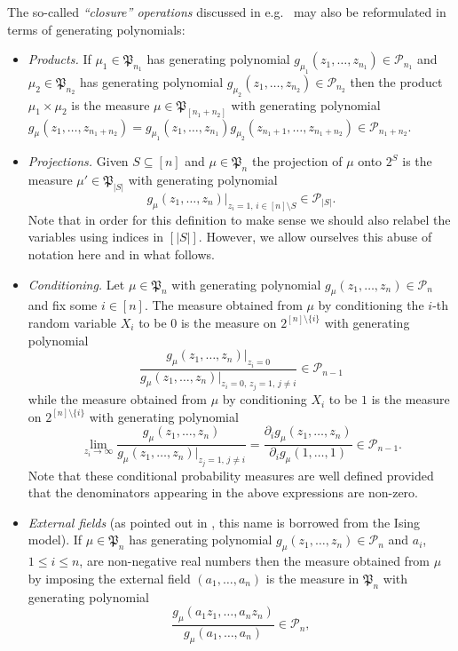 \documentclass[10pt,reqno]{amsart}
\theoremstyle{plain}
\theoremstyle{definition}
\theoremstyle{remark}
\newcommand{\PP}{\mathcal{P}}
\newcommand{\fP}{\mathfrak{P}}
\newcommand{\pa}{\partial}
\begin{document}
The so-called {\em ``closure'' operations}
discussed in e.g.~\cite[II.A]{P} may also be reformulated in terms of 
generating polynomials:

\begin{itemize}
\item[(i)] 
{\em Products.} If $\mu_1\in\fP_{n_1}$ has generating
polynomial $g_{\mu_1}(z_1,\ldots,z_{n_1})\in\PP_{n_1}$ and 
$\mu_2\in\fP_{n_2}$ has generating
polynomial $g_{\mu_2}(z_1,\ldots,z_{n_2})\in\PP_{n_2}$ then the product
$\mu_1\times \mu_2$ is the measure $\mu\in\fP_{[n_1+n_2]}$ with generating
polynomial
$g_\mu(z_1,\ldots,z_{n_1+n_2})
=g_{\mu_1}(z_1,\ldots,z_{n_1})g_{\mu_2}(z_{n_1+1},\ldots,z_{n_1+n_2})
\in\PP_{n_1+n_2}$.
\item[(ii)]
{\em Projections.} Given $S\subseteq [n]$ and $\mu\in\fP_n$ the 
projection of
$\mu$ onto $2^S$ is the measure $\mu'\in\fP_{|S|}$ with generating polynomial
$$g_\mu(z_1,\ldots,z_n)\big|_{z_i=1,\,i\in [n]\setminus S}\in\PP_{|S|}.$$
Note that in order for this definition 
to make sense we should also relabel the variables using indices in $[|S|]$. 
However, we allow ourselves this abuse of notation here and in what follows. 
\item[(iii)]
{\em Conditioning.} Let $\mu\in\fP_n$ with generating polynomial
$g_\mu(z_1,\ldots,z_n)\in\PP_n$ and fix some $i\in [n]$. The measure 
obtained from $\mu$ by conditioning the $i$-th random variable $X_i$ 
to be $0$ is the measure on $2^{[n]\setminus\{i\}}$ with generating polynomial
$$\frac{g_\mu(z_1,\ldots,z_n)\big|_{z_i=0}}
{g_\mu(z_1,\ldots,z_n)\big|_{z_i=0,\,z_j=1,\,j\neq i}}\in\PP_{n-1}$$
while the measure obtained from $\mu$ by conditioning $X_i$ 
to be $1$ is the measure on $2^{[n]\setminus\{i\}}$ with generating polynomial
$$\lim_{z_i\to\infty}\frac{g_\mu(z_1,\ldots,z_n)}
{g_\mu(z_1,\ldots,z_n)\big|_{z_j=1,\,j\neq i}}
=\frac{\pa_i g_\mu(z_1,\ldots,z_n)}
{\pa_i g_\mu(1,\ldots,1)}\in\PP_{n-1}.$$
Note that these conditional probability measures are well defined provided 
that the denominators appearing in the above expressions are non-zero.
\item[(iv)]
{\em External fields} (as pointed out in \cite[II.A]{P}, this name is 
borrowed 
from the Ising model). If  $\mu\in\fP_n$ has generating polynomial
$g_\mu(z_1,\ldots,z_n)\in\PP_n$ and $a_i$, $1\le i\le n$, are non-negative real
numbers then the measure obtained from $\mu$ by imposing the external field
$(a_1,\ldots,a_n)$ is the measure in $\fP_n$ with generating polynomial
$$\frac{g_\mu(a_1z_1,\ldots,a_nz_n)}{g_\mu(a_1,\ldots,a_n)}\in\PP_n,$$

\end{itemize}
\end{document}
